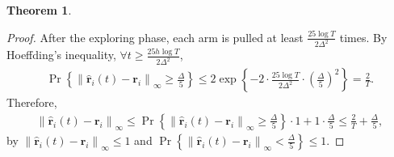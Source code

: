 \documentclass[10pt]{article}
\def\rvr{{\mathbf{r}}}
\newtheorem{thm}{Theorem}
\DeclareMathOperator*{\probability}{Pr}
\begin{document}
\begin{thm}

\end{thm}
\begin{proof}
    After the exploring phase, each arm is pulled at least $\frac{25 \log{T}}{2 \Delta^2}$ times. By Hoeffding's inequality, $\forall t \ge \frac{25 h \log{T}}{2 \Delta^2}$,
\begin{equation*}
\begin{split}
    \probability{\left\{ \left\| \hat{\rvr}_i\left(t\right) - \rvr_i \right\|_\infty \ge  \frac{\Delta}{5} \right\} } \le 2 \exp\left\{ - 2 \cdot \frac{25 \log{T}}{2 \Delta^2} \cdot  \left( \frac{\Delta}{5} \right)^2 \right\} = \frac{2}{T}.
\end{split}
\end{equation*}
Therefore,
\begin{equation*}
\begin{split}
    \left\| \hat{\rvr}_i\left(t\right) - \rvr_i \right\|_\infty \le \probability{\left\{ \left\| \hat{\rvr}_i\left(t\right) - \rvr_i \right\|_\infty \ge  \frac{\Delta}{5} \right\} } \cdot 1 + 1 \cdot \frac{\Delta}{5} \le \frac{2}{T} + \frac{\Delta}{5},
\end{split}
\end{equation*}
by $\left\| \hat{\rvr}_i\left(t\right) - \rvr_i \right\|_\infty \le 1$ and $\probability{\left\{ \left\| \hat{\rvr}_i\left(t\right) - \rvr_i \right\|_\infty <  \frac{\Delta}{5} \right\} } \le 1$.
\end{proof}
\end{document}
